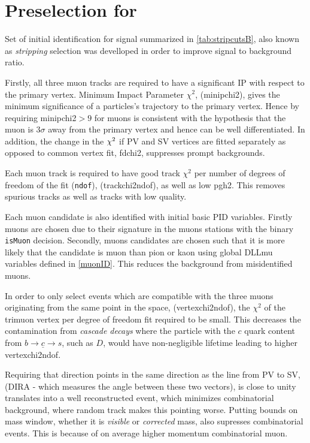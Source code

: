 \section{Preselection for \Bmumumu {}}

Set of initial identification for signal \Bmumumu summarized in \autoref{tab:stripcutsB}, also known as \textit{stripping} selection was develloped in order to improve signal to background ratio. 

Firstly, all three muon tracks are required to have a significant \gls{IP} with respect to the primary vertex. Minimum Impact Parameter $\chi^{2}$, (\gls{minipchi2}), gives the minimum significance of a particles's trajectory to the primary vertex. Hence by requiring \gls{minipchi2}$>9$ for muons is consistent with the hypothesis that the muon is $3\sigma$ away from the primary vertex and hence can be well differentiated. In addition, the change in the $\chi^2$ if \gls{PV} and \gls{SV} vertices are fitted separately as opposed to common vertex fit, \gls{fdchi2}, suppresses prompt backgrounds. 

Each muon track is required to have good track $\chi^{2}$ per number of degrees of freedom of the fit (\texttt{ndof}), (\gls{trackchi2ndof}), as well as low \gls{pgh2}. This removes spurious tracks as well as tracks with low quality.

Each muon candidate is also identified with initial basic \gls{PID} variables. Firstly muons are chosen due to their signature in the muons stations with the binary \texttt{isMuon} decision. Secondly, muons candidates are chosen such that it is more likely that the candidate is muon than pion or kaon using global DLLmu variables defined in \autoref{muonID}. This reduces the background from misidentified muons.

In order to only select events which are compatible with the three muons originating from the same point in the space, (\gls{vertexchi2ndof}), the $\chi^{2}$ of the trimuon vertex per degree of freedom fit required to be small. This decreases the contamination from \textit{cascade decays} where the particle with the $c$ quark content from $b \rightarrow \underline{c} \rightarrow s$, such as $D$, would have non-negligible lifetime leading to higher \gls{vertexchi2ndof}. 

Requiring that \Bp direction points in the same direction as the line from \gls{PV} to \gls{SV}, (\gls{DIRA} - which measures the angle between these two vectors), is close to unity translates into a well reconstructed event, which minimizes combinatorial background, where random track makes this pointing worse. Putting bounds on mass window, whether it is \textit{visible} or \textit{corrected} mass, also supresses combinatorial events. This is because of on average higher momentum combinatorial muon.  


